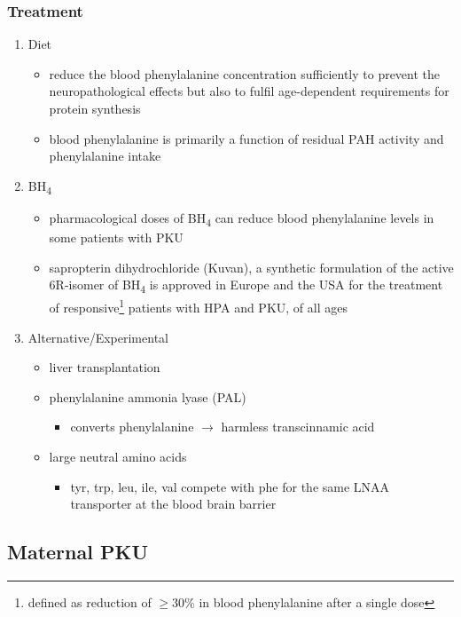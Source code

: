 \documentclass[12pt]{scrartcl}
\begin{document}
\subsubsection{Treatment}
\label{sec:org9310b8d}
\begin{enumerate}
\item Diet
\label{sec:org33d109d}
\begin{itemize}
\item reduce the blood phenylalanine concentration sufficiently to prevent the
neuropathological effects but also to fulfil age-dependent
requirements for protein synthesis
\item blood phenylalanine is primarily a function of residual PAH activity and phenylalanine
intake
\end{itemize}
\item BH\textsubscript{4}
\label{sec:orgd41df17}
\begin{itemize}
\item pharmacological doses of BH\textsubscript{4} can reduce blood phenylalanine levels
in some patients with PKU
\item sapropterin dihydrochloride (Kuvan), a synthetic formulation of the
active 6R-isomer of BH\textsubscript{4} is approved in Europe and the USA for the
treatment of responsive\footnote{defined as reduction of \(\ge\)30\% in blood phenylalanine after a
single dose} patients with HPA and PKU, of all
ages
\end{itemize}
\item Alternative/Experimental
\label{sec:org2a419cd}
\begin{itemize}
\item liver transplantation
\item phenylalanine ammonia lyase (PAL)
\begin{itemize}
\item converts phenylalanine \(\to\) harmless transcinnamic acid
\end{itemize}
\item large neutral amino acids
\begin{itemize}
\item tyr, trp, leu, ile, val compete with phe for the same LNAA transporter at
the blood brain barrier
\end{itemize}
\end{itemize}
\end{enumerate}

\subsection{Maternal PKU}
\label{sec:org7e3c25f}
\end{document}
